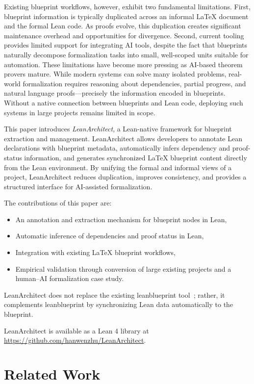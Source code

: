 \documentclass{article}
\newcommand{\leanarchitect}{LeanArchitect\xspace}
\newcommand{\leanblueprint}{leanblueprint\xspace}
\begin{document}
Existing blueprint workflows, however, exhibit two fundamental limitations. First, blueprint information is typically duplicated across an informal \LaTeX{} document and the formal Lean code. As proofs evolve, this duplication creates significant maintenance overhead and opportunities for divergence. Second, current tooling provides limited support for integrating AI tools, despite the fact that blueprints naturally decompose formalization tasks into small, well-scoped units suitable for automation. These limitations have become more pressing as AI-based theorem provers mature. While modern systems can solve many isolated problems, real-world formalization requires reasoning about dependencies, partial progress, and natural language proofs---precisely the information encoded in blueprints. Without a native connection between blueprints and Lean code, deploying such systems in large projects remains limited in scope.

This paper introduces \emph{\leanarchitect}, a Lean-native framework for blueprint extraction and management. \leanarchitect allows developers to annotate Lean declarations with blueprint metadata, automatically infers dependency and proof-status information, and generates synchronized \LaTeX{} blueprint content directly from the Lean environment. By unifying the formal and informal views of a project, \leanarchitect reduces duplication, improves consistency, and provides a structured interface for AI-assisted formalization.

The contributions of this paper are:
\begin{itemize}
\item An annotation and extraction mechanism for blueprint nodes in Lean,
\item Automatic inference of dependencies and proof status in Lean,
\item Integration with existing \LaTeX{} blueprint workflows,
\item Empirical validation through conversion of large existing projects and a human--AI formalization case study.
\end{itemize}

\leanarchitect does not replace the existing \leanblueprint tool~\cite{massot_leanblueprint}; rather, it complements \leanblueprint by synchronizing Lean data automatically to the blueprint.

\leanarchitect is available as a Lean 4 library at \url{https://github.com/hanwenzhu/LeanArchitect}.

\section{Related Work}
\end{document}
